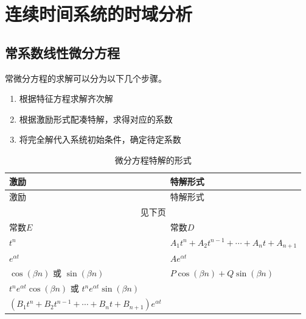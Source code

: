 \documentclass[cn,11pt,chinese,black,simple]{../elegantbook}
\begin{document}
\fi 


\chapter{连续时间系统的时域分析}

\section{常系数线性微分方程}

常微分方程的求解可以分为以下几个步骤。

\begin{enumerate}
  \item 根据特征方程求解齐次解
  \item 根据激励形式配凑特解，求得对应的系数
  \item 将完全解代入系统初始条件，确定待定系数
\end{enumerate}



\begin{longtable}{ll} 
  \caption{微分方程特解的形式} \\ 
  \toprule
  激励 &  特解形式\\
  \midrule
  \endfirsthead
  
  \toprule
  激励 &  特解形式\\
  \midrule
  \endhead 

  \hline
  \multicolumn{2}{c}{见下页}\\   \bottomrule
  \endfoot

  \bottomrule
  \endlastfoot

  常数\(E\) & 常数\(D\) \\
  \(t^n\) & \(A_1 t^n + A_2 t^{n-1} + \cdots + A_n t + A_{n+1}\) \\
  \(e^{\alpha t}\) & \(A e^{\alpha t}\) \\
  \(\cos (\beta n)\) 或 \(\sin (\beta n)\) & \(P \cos(\beta n) + Q \sin(\beta n)\) \\
  \(t^n e^{\alpha t}\cos (\beta n)\) 或 \(t^n e^{\alpha t}\sin (\beta n)\) & \begin{tabular}[c]{@{}l@{}}\((A_1 t^n + A_2 t^{n-1} + \cdots + A_n t + A_{n+1})e^{\alpha t} \cos(\beta n) +\)\\ \( (B_1 t^n + B_2 t^{n-1} + \cdots + B_n t + B_{n+1})e^{\alpha t}\)\end{tabular} \\

\end{longtable}
\end{document}
